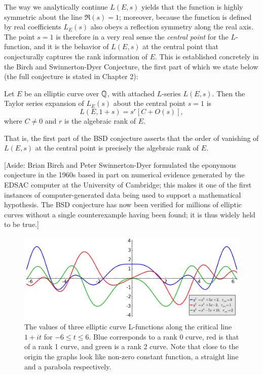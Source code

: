 \documentclass[10pt]{article}
\begin{document}
The way we analytically continue $L(E,s)$ yields that the function is highly symmetric about the line $\Re(s)=1$; moreover, because the function is defined by real coefficients $L_E(s)$ also obeys a reflection symmetry along the real axis. The point $s=1$ is therefore in a very real sense the {\it central point} for the $L$-function, and it is the behavior of $L(E,s)$ at the central point that conjecturally captures the rank information of $E$. This is established concretely in the Birch and Swinnerton-Dyer Conjecture, the first part of which we state below (the full conjecture is stated in Chapter 2):

\begin{conjecture}
Let $E$ be an elliptic curve over $\mathbb{Q}$, with attached $L$-series $L(E,s)$. Then the Taylor series expansion of $L_E(s)$ about the central point $s=1$ is
\begin{equation}
L(E,1+s) = s^r\left[C  +O(s)\right],
\end{equation}
where
$C \ne 0$ and $r$ is the algebraic rank of $E$.
\end{conjecture}
That is, the first part of the BSD conjecture asserts that the order of vanishing of $L(E,s)$ at the central point is precisely the algebraic rank of $E$.

[Aside: Brian Birch and Peter Swinnerton-Dyer formulated the eponymous conjecture in the 1960s based in part on numerical evidence generated by the EDSAC computer at the University of Cambridge; this makes it one of the first instances of computer-generated data being used to support a mathematical hypothesis. The BSD conjecture has now been verified for millions of elliptic curves without a single counterexample having been found; it is thus widely held to be true.]

\begin{figure}[!h]
    \centering
    \includegraphics[width=1.0\textwidth]{graphics/L-functions_at_origin.png}
    \caption{The values of three elliptic curve L-functions along the critical line $1+it$ for $-6 \le t \le 6$. Blue corresponds to a rank 0 curve, red is that of a rank 1 curve, and green is a rank 2 curve. Note that close to the origin the graphs look like non-zero constant function, a straight line and a parabola respectively.}
    \label{fig:L-functions_at_origin}
\end{figure}
\end{document}
